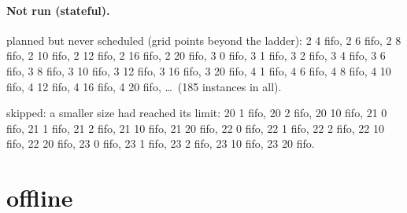 \documentclass[10pt]{article}
\begin{document}
\paragraph{Not run (stateful).}
planned but never scheduled (grid points beyond the ladder): 2 4 fifo, 2 6 fifo, 2 8 fifo, 2 10 fifo, 2 12 fifo, 2 16 fifo, 2 20 fifo, 3 0 fifo, 3 1 fifo, 3 2 fifo, 3 4 fifo, 3 6 fifo, 3 8 fifo, 3 10 fifo, 3 12 fifo, 3 16 fifo, 3 20 fifo, 4 1 fifo, 4 6 fifo, 4 8 fifo, 4 10 fifo, 4 12 fifo, 4 16 fifo, 4 20 fifo, \ldots\ (185 instances in all).\par
skipped: a smaller size had reached its limit: 20 1 fifo, 20 2 fifo, 20 10 fifo, 21 0 fifo, 21 1 fifo, 21 2 fifo, 21 10 fifo, 21 20 fifo, 22 0 fifo, 22 1 fifo, 22 2 fifo, 22 10 fifo, 22 20 fifo, 23 0 fifo, 23 1 fifo, 23 2 fifo, 23 10 fifo, 23 20 fifo.\par
\section*{offline}
\end{document}
